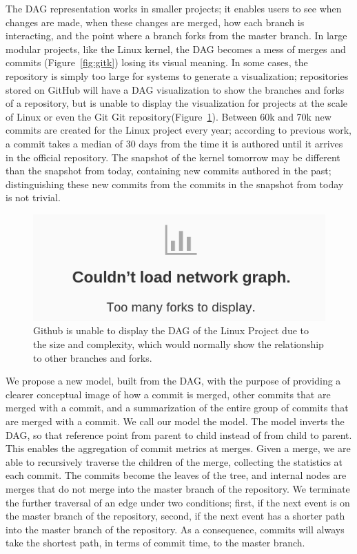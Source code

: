 
The DAG representation works in smaller projects; it enables users to
see when changes are made, when these changes are merged, how each
branch is interacting, and the point where a branch forks from the
master branch. In large modular projects, like the Linux kernel, the DAG
becomes a mess of merges and commits (Figure~\ref{fig:gitk}) losing its
visual meaning. In some cases, the repository is simply too large for
systems to generate a visualization; repositories stored on GitHub will
have a DAG visualization to show the branches and forks of a
repository, but is unable to display the visualization for projects at
the scale of Linux or even the Git Git
repository(Figure~\ref{fig:gitfail}). Between 60k and 70k new commits
are created for the Linux project every year; according to previous
work\cite{German2015}, a commit takes a median of 30 days from the time
it is authored until it arrives in the official repository. The snapshot
of the kernel tomorrow may be different than the snapshot from today,
containing new commits authored in the past; distinguishing these new
commits from the commits in the snapshot from today is not trivial.

\begin{figure}
  \centering
  \includegraphics[width=0.8\linewidth]{figures/github_viewer.png}
  \caption{Github is unable to display the DAG of the Linux
    Project due to the size and complexity, which would normally
    show the relationship to other branches and forks.}
  \label{fig:gitfail}
\end{figure}


We propose a new model, built from the DAG, with the purpose of
providing a clearer conceptual image of how a commit is merged, other
commits that are merged with a commit, and a summarization of the entire
group of commits that are merged with a commit. We call our model the
\mt model. The model inverts the DAG, so that reference point from
parent to child instead of from child to parent. This enables the
aggregation of commit metrics at merges. Given a merge, we are able to
recursively traverse the children of the merge, collecting the
statistics at each commit. The commits become the leaves of the tree,
and internal nodes are merges that do not merge into the master branch
of the repository. We terminate the further traversal of an edge under
two conditions; first, if the next event is on the master branch of the
repository, second, if the next event has a shorter path into the master
branch of the repository. As a consequence, commits will always take the
shortest path, in terms of commit time, to the master branch.


